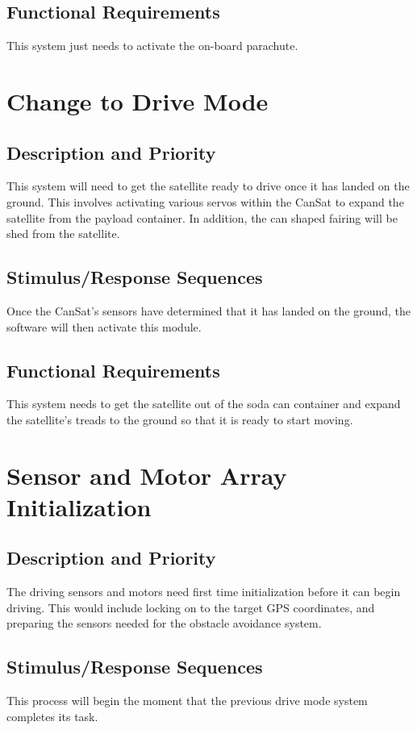 \documentclass{scrreprt}
\begin{document}
\subsection{Functional Requirements}
This system just needs to activate the on-board parachute.


\section{Change to Drive Mode}

\subsection{Description and Priority}
This system will need to get the satellite ready to drive once it has landed on the ground. This involves activating various servos within the CanSat to expand the satellite from the payload container. In addition, the can shaped fairing will be shed from the satellite. 


\subsection{Stimulus/Response Sequences}
Once the CanSat's sensors have determined that it has landed on the ground, the software will then activate this module.

\subsection{Functional Requirements}
This system needs to get the satellite out of the soda can container and expand the satellite's treads to the ground so that it is ready to start moving.

\section{Sensor and Motor Array Initialization}

\subsection{Description and Priority}
The driving sensors and motors need first time initialization before it can begin driving. This would include locking on to the target GPS coordinates, and preparing the sensors needed for the obstacle avoidance system.


\subsection{Stimulus/Response Sequences}
This process will begin the moment that the previous drive mode system completes its task. 
\end{document}
